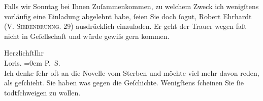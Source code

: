 \pstart
           Falls wir Sonntag bei Ihnen Zuſammenkommen, zu welchem {\pb}Zweck ich wenigſtens vorläufig
               eine Einladung abgelehnt habe,{ }ſeien Sie doch{ }ſogut, Robert Ehrhardt (\textsc{V. Siebenbrunng. 29}) ausdrücklich einzuladen. Er geht der Trauer wegen
               faſt nicht in Geſellschaft und würde gewiſs gern kommen.\pend
           
\pstart
           Herzlichſt\hspace*{2.5em}Ihr{\\[\baselineskip]}\spacefill\mbox{Loris.}\pend
           \leftskip=0em{}
\pstart
           \noindent{}P. S.{\\}Ich denke{ }ſehr oft an die Novelle vom Sterben und möchte viel mehr davon reden, als geſchieht. Sie haben was
                  gegen die Geſchichte. Wenigſtens{ }ſcheinen Sie{ }ſie todtſchweigen zu wollen.\pend
           \endnumbering{}  \newcommand{\dateiname}{L00171}\newcommand{\titel}{Hugo von Hofmannsthal an Arthur Schnitzler, 1. 2. [1893]}\newcommand{\editorInnen}{Herausgegeben von Martin Anton Müller}
